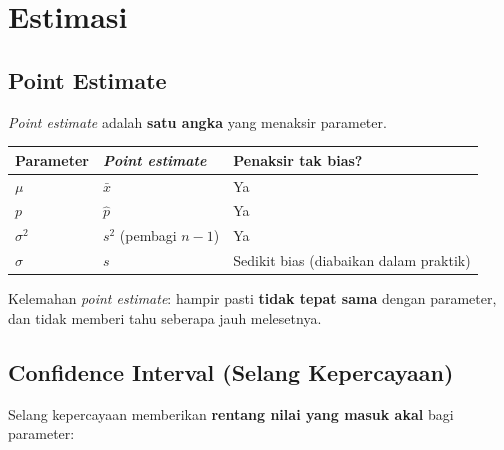 \documentclass[
  indonesian,
  letterpaper,
]{book}
\newcounter{none} %
\begin{document}

\chapter{Estimasi}\label{estimasi}

\section{Point Estimate}\label{point-estimate}

\emph{Point estimate} adalah \textbf{satu angka} yang menaksir
parameter.

{\def\LTcaptype{none} %
\begin{longtable}[]{@{}
  >{\raggedright\arraybackslash}p{}
  >{\raggedright\arraybackslash}p{}
  >{\centering\arraybackslash}p{}@{}}
\toprule\noalign{}
\begin{minipage}[b]{\linewidth}\raggedright
Parameter
\end{minipage} & \begin{minipage}[b]{\linewidth}\raggedright
\emph{Point estimate}
\end{minipage} & \begin{minipage}[b]{\linewidth}\centering
Penaksir tak bias?
\end{minipage} \\
\midrule\noalign{}
\endhead
\bottomrule\noalign{}
\endlastfoot
\(\mu\) & \(\bar{x}\) & Ya \\
\(p\) & \(\hat{p}\) & Ya \\
\(\sigma^2\) & \(s^2\) (pembagi \(n-1\)) & Ya \\
\(\sigma\) & \(s\) & Sedikit bias (diabaikan dalam praktik) \\
\end{longtable}
}

Kelemahan \emph{point estimate}: hampir pasti \textbf{tidak tepat sama}
dengan parameter, dan tidak memberi tahu seberapa jauh melesetnya.

\section{Confidence Interval (Selang
Kepercayaan)}\label{confidence-interval-selang-kepercayaan}

Selang kepercayaan memberikan \textbf{rentang nilai yang masuk akal}
bagi parameter:
\end{document}
